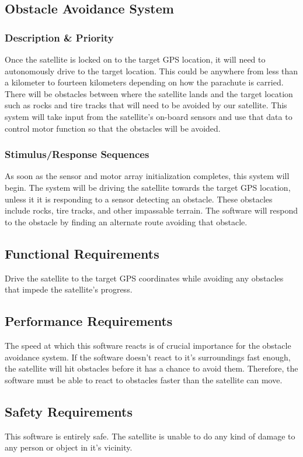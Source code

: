 \documentclass[10pt,onecolumn,draftclsnofoot,document]{IEEEtran}
\begin{document}
\subsection{Obstacle Avoidance System}

\subsubsection{Description \& Priority}
Once the satellite is locked on to the target GPS location, it will need to autonomously drive to the target location. This could be anywhere from less than a kilometer to fourteen kilometers depending on how the parachute is carried. There will be obstacles between where the satellite lands and the target location such as rocks and tire tracks that will need to be avoided by our satellite. This system will take input from the satellite's on-board sensors and use that data to control motor function so that the obstacles will be avoided.

\subsubsection{Stimulus/Response Sequences}
As soon as the sensor and motor array initialization completes, this system will begin. The system will be driving the satellite towards the target GPS location, unless it it is responding to a sensor detecting an obstacle. These obstacles include rocks, tire tracks, and other impassable terrain. The software will respond to the obstacle by finding an alternate route avoiding that obstacle. 

\subsection{Functional Requirements}
Drive the satellite to the target GPS coordinates while avoiding any obstacles that impede the satellite's progress.

\subsection{Performance Requirements}
The speed at which this software reacts is of crucial importance for the obstacle avoidance system. If the software doesn't react to it's surroundings fast enough, the satellite will hit obstacles before it has a chance to avoid them. Therefore, the software must be able to react to obstacles faster than the satellite can move.

\subsection{Safety Requirements}
This software is entirely safe. The satellite is unable to do any kind of damage to any person or object in it's vicinity.
\end{document}
